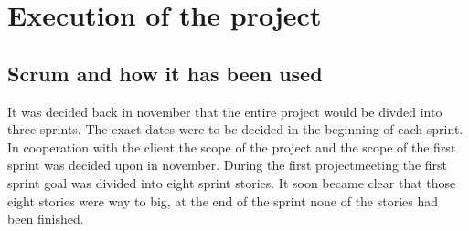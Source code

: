 


\section{Execution of the project}
\subsection{Scrum and how it has been used}
It was decided back in november that the entire project would be divded into three sprints.
The exact dates were to be decided in the beginning of each sprint.
In cooperation with the client the scope of the project and the scope of the first sprint was decided upon in november.
During the first projectmeeting the first sprint goal was divided into eight sprint stories.
It soon became clear that those eight stories were way to big, at the end of the sprint none of the stories had been finished.

